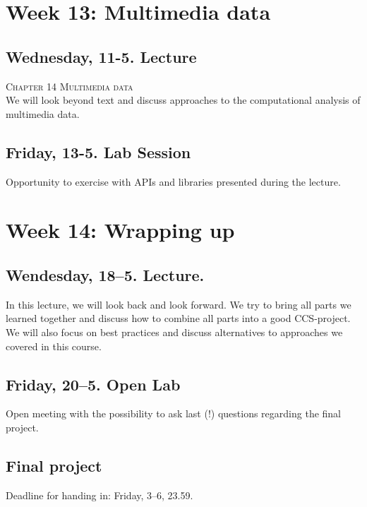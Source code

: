 


\section*{Week 13: Multimedia data}

\subsection*{Wednesday, 11-5. Lecture}
\textsc{ Chapter 14 Multimedia data}\\
We will look beyond text and discuss approaches to the computational analysis of multimedia data.


\subsection*{Friday, 13-5. Lab Session}
Opportunity to exercise with APIs and libraries presented during the lecture.




\section*{Week 14: Wrapping up}

\subsection*{Wendesday, 18--5. Lecture.}
In this lecture, we will look back and look forward. We try to bring all parts we learned together and discuss how to combine all parts into a good CCS-project. We will also focus on best practices and discuss alternatives to approaches we covered in this course. 



\subsection*{Friday, 20--5. Open Lab}
Open meeting with the possibility to ask last (!) questions regarding the final project.


\subsection*{Final project}
Deadline for handing in: Friday, 3--6, 23.59.
